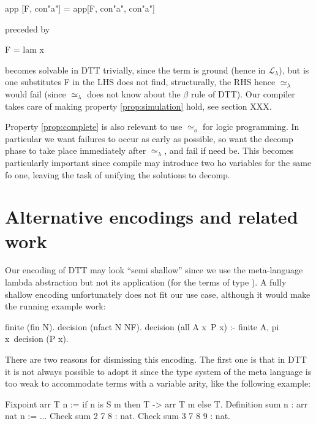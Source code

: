 \documentclass[sigconf,natbib=false]{acmart}
\newcommand{\UnifRel}{\ensuremath{\simeq}}
\newcommand{\Uo}{\ensuremath{\UnifRel_o}\xspace}
\newcommand{\Ue}{\ensuremath{\UnifRel_\lambda}\xspace}
\newcommand{\llambda}{\ensuremath{\mathcal{L}_\lambda}\xspace}
\begin{document}
\begin{elpicode}
app [F, con"a"] = app[F, con"a", con"a"]
\end{elpicode}

\noindent
preceded by 

\begin{elpicode}
F = lam x\app[const f,x,x]
\end{elpicode}

\noindent
becomes solvable in DTT trivially, since the term is ground (hence in \llambda),
but is one substitutes F in the LHS does not find, structurally, the RHS
hence \Ue would fail (since \Ue does not know about the $\beta$ rule of DTT).
Our compiler takes care of making property \ref{prop:simulation} hold, see
section XXX.

Property \ref{prop:complete} is also relevant to use \Uo for logic programming.
In particular we want failures to occur as early as possible, so want
the decomp phase to take place immediately after \Ue, and fail if need be.
This becomes particularly important since compile may introduce two
ho variables for the same fo one, leaving the task of unifying the solutions
to decomp.

\section{Alternative encodings and related work}


Our encoding of DTT may look ``semi shallow'' since we use the meta-language
lambda abstraction but not its application (for the terms of type ).
A fully shallow encoding unfortunately does not fit our use case, although
it would make the running example work:

\begin{elpicode}
finite (fin N).
decision (nfact N NF).
decision (all A x\ P x) :- finite A, pi x\ decision (P x).
\end{elpicode}

\noindent
There are two reasons for dismissing this encoding. The first one is that
in DTT it is not always possible to adopt it since the type system
of the meta language is too weak to accommodate terms with a variable arity,
like the following example:

\begin{coqcode}
Fixpoint arr T n := if n is S m then T -> arr T m else T.
Definition sum n : arr nat n := ...
Check sum 2   7 8   : nat.
Check sum 3   7 8 9 : nat.
\end{coqcode}
\end{document}
